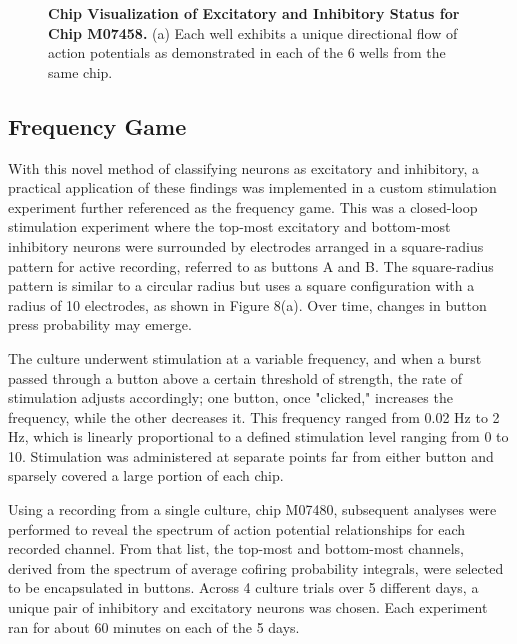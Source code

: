 \documentclass{article} %
\begin{document}
\begin{figure}
    \centering
    \caption{\textbf{Chip Visualization of Excitatory and Inhibitory Status for Chip M07458.} (a) Each well exhibits a unique directional flow of action potentials as demonstrated in each of the 6 wells from the same chip.}
\end{figure}


\FloatBarrier

\subsection{Frequency Game}
With this novel method of classifying neurons as excitatory and inhibitory, a practical application of these findings was implemented in a custom stimulation experiment further referenced as the frequency game. This was a closed-loop stimulation experiment where the top-most excitatory and bottom-most inhibitory neurons were surrounded by electrodes arranged in a square-radius pattern for active recording, referred to as buttons A and B. The square-radius pattern is similar to a circular radius but uses a square configuration with a radius of 10 electrodes, as shown in Figure 8(a). Over time, changes in button press probability may emerge.

The culture underwent stimulation at a variable frequency, and when a burst passed through a button above a certain threshold of strength, the rate of stimulation adjusts accordingly; one button, once "clicked," increases the frequency, while the other decreases it. This frequency ranged from 0.02 Hz to 2 Hz, which is linearly proportional to a defined stimulation level ranging from 0 to 10. Stimulation was administered at separate points far from either button and sparsely covered a large portion of each chip.

Using a recording from a single culture, chip M07480, subsequent analyses were performed to reveal the spectrum of action potential relationships for each recorded channel. From that list, the top-most and bottom-most channels, derived from the spectrum of average cofiring probability integrals, were selected to be encapsulated in buttons. Across 4 culture trials over 5 different days, a unique pair of inhibitory and excitatory neurons was chosen. Each experiment ran for about 60 minutes on each of the 5 days.
\end{document}
